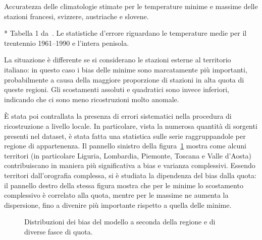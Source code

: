 \begin{table}[ht]
  \centering
  \begin{adjustbox}{max width=\textwidth}
    \begin{threeparttable}
      \caption{Accuratezza delle climatologie stimate per le temperature minime e massime delle stazioni francesi, svizzere, austriache e slovene.}\label{tab:bias-non-ita}
      
      \begin{tablenotes}
      \item[*] Tabella 1 da~\cite[p.~10]{brunettiHighresolutionTemperatureClimatology2014}. Le statistiche d'errore riguardano le temperature medie per il trentennio 1961--1990 e l'intera penisola.
      \end{tablenotes}
    \end{threeparttable}
  \end{adjustbox}
\end{table}
La situazione è differente se si considerano le stazioni esterne al territorio italiano: in questo caso i bias delle minime sono marcatamente più importanti, probabilmente a causa della maggiore proporzione di stazioni in alta quota di queste regioni. Gli scostamenti assoluti e quadratici sono invece inferiori, indicando che ci sono meno ricostruzioni molto anomale.

È stata poi contrallata la presenza di errori sistematici nella procedura di ricostruzione a livello locale. In particolare, vista la numerosa quantità di sorgenti presenti nel dataset, è stata fatta una statistica sulle serie raggruppandole per regione di appartenenza. Il pannello sinistro della figura~\ref{fig:boxplots-ita} mostra come alcuni territori (in particolare Liguria, Lombardia, Piemonte, Toscana e Valle d'Aosta) contribuiscano in maniera più significativa a bias e varianza complessivi. Essendo territori dall'orografia complessa, si è studiata la dipendenza del bias dalla quota: il pannello destro della stessa figura mostra che per le minime lo scostamento complessivo è correlato alla quota, mentre per le massime ne aumenta la dispersione, fino a divenire più importante rispetto a quella delle minime.

\begin{figure}[ht]
  \centering
  
  \caption{Distribuzioni dei bias del modello a seconda della regione e di diverse fasce di quota.}\label{fig:boxplots-ita}
\end{figure}

